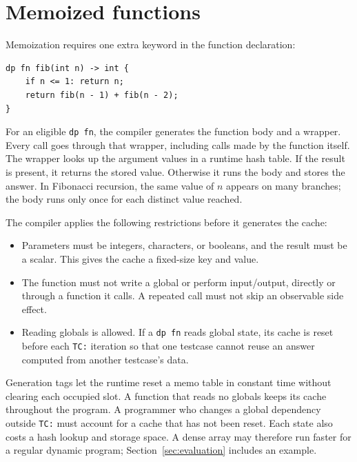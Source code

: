 \documentclass[12pt,a4paper]{report}
\begin{document}
\section{Memoized functions}
Memoization requires one extra keyword in the function declaration:
\begin{verbatim}
dp fn fib(int n) -> int {
    if n <= 1: return n;
    return fib(n - 1) + fib(n - 2);
}
\end{verbatim}
For an eligible \texttt{dp fn}, the compiler generates the function body and a wrapper. Every call goes through that wrapper, including calls made by the function itself. The wrapper looks up the argument values in a runtime hash table. If the result is present, it returns the stored value. Otherwise it runs the body and stores the answer. In Fibonacci recursion, the same value of $n$ appears on many branches; the body runs only once for each distinct value reached.

The compiler applies the following restrictions before it generates the cache:
\begin{itemize}
\item Parameters must be integers, characters, or booleans, and the result must be a scalar. This gives the cache a fixed-size key and value.
\item The function must not write a global or perform input/output, directly or through a function it calls. A repeated call must not skip an observable side effect.
\item Reading globals is allowed. If a \texttt{dp fn} reads global state, its cache is reset before each \texttt{TC:} iteration so that one testcase cannot reuse an answer computed from another testcase's data.
\end{itemize}
Generation tags let the runtime reset a memo table in constant time without clearing each occupied slot. A function that reads no globals keeps its cache throughout the program. A programmer who changes a global dependency outside \texttt{TC:} must account for a cache that has not been reset. Each state also costs a hash lookup and storage space. A dense array may therefore run faster for a regular dynamic program; Section~\ref{sec:evaluation} includes an example.
\end{document}
